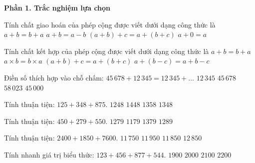 \textbf{Phần 1. Trắc nghiệm lựa chọn}

\begin{ex} %
Tính chất giao hoán của phép cộng được viết dưới dạng công thức là
\choice
{\True $a + b = b + a$}
{$a + b = a - b$}
{$(a + b) + c = a + (b + c)$}
{$a + 0 = a$}
\end{ex}

\begin{ex} %
Tính chất kết hợp của phép cộng được viết dưới dạng công thức là
\choice
{$a + b = b + a$}
{$a \times b = b \times a$}
{\True $(a + b) + c = a + (b + c)$}
{$a + (b - c) = a + b - c$}
\end{ex}

\begin{ex} %
Điền số thích hợp vào chỗ chấm: $45\,678 + 12\,345 = 12\,345 + \dots$
\choice
{$12\,345$}
{\True $45\,678$}
{$58\,023$}
{$45\,000$}
\end{ex}

\begin{ex} %
Tính thuận tiện: $125 + 348 + 875$.
\choice
{$1248$}
{$1448$}
{$1358$}
{\True $1348$}
\end{ex}

\begin{ex} %
Tính thuận tiện: $450 + 279 + 550$.
\choice
{\True $1279$}
{$1179$}
{$1379$}
{$1289$}
\end{ex}

\begin{ex} %
Tính thuận tiện: $2400 + 1850 + 7600$.
\choice
{$11\,750$}
{$11\,950$}
{\True $11\,850$}
{$12\,850$}
\end{ex}

\begin{ex} %
Tính nhanh giá trị biểu thức: $123 + 456 + 877 + 544$.
\choice
{$1900$}
{\True $2000$}
{$2100$}
{$2200$}
\end{ex}

